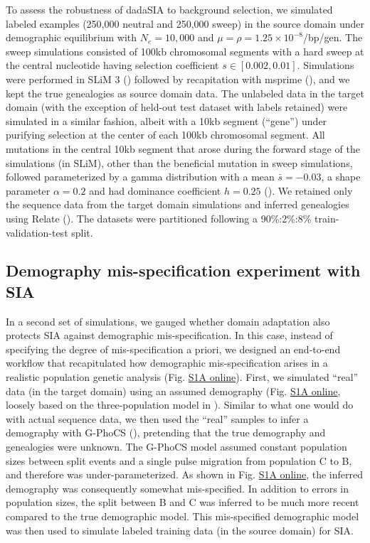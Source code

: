 To assess the robustness of \ac{dadaSIA} to background selection, we simulated labeled examples (250,000 neutral and 250,000 sweep) in the source domain under demographic equilibrium with $N_e = 10,000$ and $\mu = \rho = 1.25\times 10^{-8}$/bp/gen. The sweep simulations consisted of 100kb chromosomal segments with a hard sweep at the central nucleotide having selection coefficient $s \in [0.002, 0.01]$. Simulations were performed in SLiM 3 (\cite{haller_slim_2019,haller_tree-sequence_2019}) followed by recapitation with msprime (\cite{baumdicker_efficient_2022}), and we kept the true genealogies as source domain data. The unlabeled data in the target domain (with the exception of held-out test dataset with labels retained) were simulated in a similar fashion, albeit with a 10kb segment (“gene”) under purifying selection at the center of each 100kb chromosomal segment. All mutations in the central 10kb segment that arose during the forward stage of the simulations (in SLiM), other than the beneficial mutation in sweep simulations, followed  parameterized by a gamma distribution with a mean $\bar{s} = -0.03$, a shape parameter $\alpha = 0.2$ and had dominance coefficient $h=0.25$ (\cite{boyko_assessing_2008}). We retained only the sequence data from the target domain simulations and inferred genealogies using Relate (\cite{speidel_method_2019}). The datasets were partitioned following a 90\%:2\%:8\% train-validation-test split.

\subsection{Demography mis-specification experiment with \ac{SIA}}

In a second set of simulations, we gauged whether domain adaptation also protects \ac{SIA} against demographic mis-specification. In this case, instead of specifying the degree of mis-specification a priori, we designed an end-to-end workflow that recapitulated how demographic mis-specification arises in a realistic population genetic analysis (Fig. \href{https://journals.plos.org/plosgenetics/article?id=10.1371/journal.pgen.1011032#sec018}{S1A online}). First, we simulated “real” data (in the target domain) using an assumed demography (Fig. \href{https://journals.plos.org/plosgenetics/article?id=10.1371/journal.pgen.1011032#sec018}{S1A online}, loosely based on the three-population model in \cite{campagna_selective_2022}). Similar to what one would do with actual sequence data, we then used the “real” samples to infer a demography with G-PhoCS (\cite{gronau_bayesian_2011}), pretending that the true demography and genealogies were unknown. The G-PhoCS model assumed constant population sizes between split events and a single pulse migration from population C to B, and therefore was under-parameterized. As shown in Fig. \href{https://journals.plos.org/plosgenetics/article?id=10.1371/journal.pgen.1011032#sec018}{S1A online}, the inferred demography was consequently somewhat mis-specified. In addition to errors in population sizes, the split between B and C was inferred to be much more recent compared to the true demographic model. This mis-specified demographic model was then used to simulate labeled training data (in the source domain) for \ac{SIA}.


